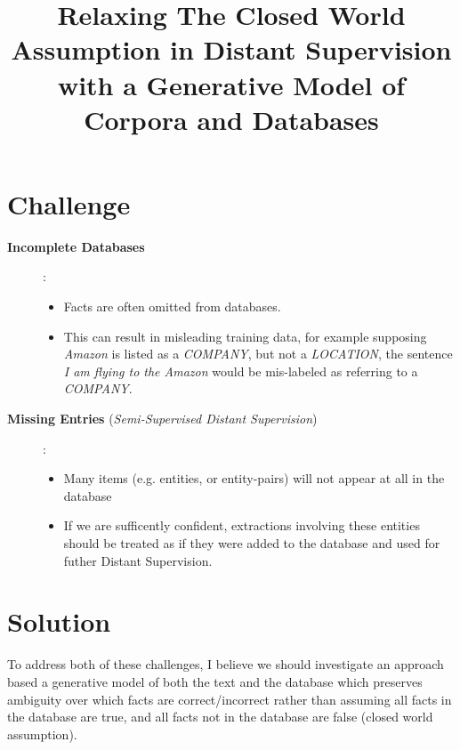 \documentclass[12pt]{article}
\begin{document}
\date{}
\title{Relaxing The Closed World Assumption in Distant Supervision with a Generative Model of Corpora and Databases}
\author{}
\maketitle



\section{Challenge}
\begin{description}
  \item[{\bf Incomplete Databases}]:
    \begin{itemize}
    \item Facts are often omitted from databases.
    \item This can result in misleading training data, for example supposing \emph{Amazon} is listed as a {\sl COMPANY},
      but not a {\sl LOCATION}, the sentence \emph{I am flying to the Amazon} would be mis-labeled as referring
      to a {\sl COMPANY}.
    \end{itemize}
  \item[{\bf Missing Entries} (\emph{Semi-Supervised Distant Supervision})]:
    \begin{itemize}
      \item Many items (e.g. entities, or entity-pairs) will not appear at all in the database
      \item If we are sufficently confident, extractions involving these entities should be treated as if they were added to the database
        and used for futher Distant Supervision.
    \end{itemize}
\end{description}

\section{Solution}
To address both of these challenges, I believe we should investigate an approach based a generative model of both the text and the database which
preserves ambiguity over which facts are correct/incorrect rather than assuming all facts in the database are true, and all facts not in the database
are false (closed world assumption).
\end{document}

